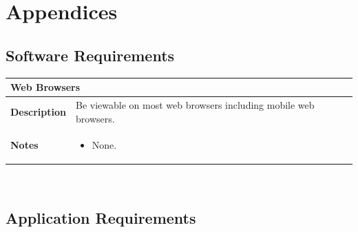 \documentclass[12pt,english]{article}
\providecommand{\tabularnewline}{\\}
\begin{document}
\section{Appendices}


\subsection{Software Requirements}

\begin{tabular}{|p{3cm}|p{13cm}|}
\hline 
\multicolumn{2}{|l|}{\textbf{Web Browsers}}\tabularnewline
\hline 
\textbf{Description}  & Be viewable on most web browsers including mobile web browsers. \tabularnewline
\hline 
\textbf{Notes}  & \begin{itemize}
\item None. \end{itemize}
\tabularnewline
\hline 
\end{tabular}\\[0.5cm]


\subsection{Application Requirements}
\end{document}
